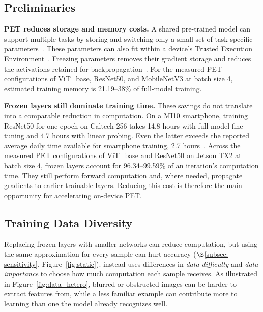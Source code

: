 

\subsection{Preliminaries}
\label{subsec:pre-measure}
\begingroup
\color{blue}
\noindent \textbf{PET reduces storage and memory costs.}
A shared pre-trained model can support multiple tasks by storing and switching only a small set of task-specific parameters~\cite{yuan2023rethinking, yang2023edgefm}.
These parameters can also fit within a device's Trusted Execution Environment~\cite{zhang2023no}.
Freezing parameters removes their gradient storage and reduces the activations retained for backpropagation~\cite{NEURIPS2020_81f7acab}.
For the measured PET configurations of ViT\_base, ResNet50, and MobileNetV3 at batch size 4, estimated training memory is 21.19--38\% of full-model training.

\noindent \textbf{Frozen layers still dominate training time.}
These savings do not translate into a comparable reduction in computation.
On a MI10 smartphone, training ResNet50 for one epoch on Caltech-256 takes 14.8 hours with full-model fine-tuning and 4.7 hours with linear probing.
Even the latter exceeds the reported average daily time available for smartphone training, 2.7 hours~\cite{xu2018deeptype}.
Across the measured PET configurations of ViT\_base and ResNet50 on Jetson TX2 at batch size 4, frozen layers account for 96.34--99.59\% of an iteration's computation time.
They still perform forward computation and, where needed, propagate gradients to earlier trainable layers.
Reducing this cost is therefore the main opportunity for accelerating on-device PET.
\endgroup

\subsection{Training Data Diversity}
\label{subsec:Opportunity: Training Data diversity}
\begingroup
\color{blue}
Replacing frozen layers with smaller networks can reduce computation, but using the same approximation for every sample can hurt accuracy ($\S$\ref{subsec: sensitivity}, Figure~\ref{fig:static}).
\sys instead uses differences in \textit{data difficulty} and \textit{data importance} to choose how much computation each sample receives.
As illustrated in Figure~\ref{fig:data_hetero}, blurred or obstructed images can be harder to extract features from, while a less familiar example can contribute more to learning than one the model already recognizes well.


